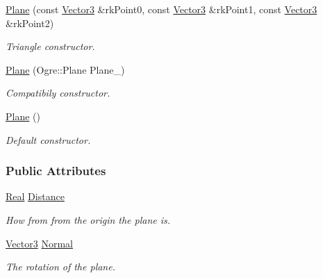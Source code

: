 \begin{DoxyCompactItemize}
\hyperlink{classMezzanine_1_1Plane_aabe30579ed531b3b0b2a7bd9ad412d3f}{Plane} (const \hyperlink{classMezzanine_1_1Vector3}{Vector3} \&rkPoint0, const \hyperlink{classMezzanine_1_1Vector3}{Vector3} \&rkPoint1, const \hyperlink{classMezzanine_1_1Vector3}{Vector3} \&rkPoint2)
\begin{DoxyCompactList}\small\item\em Triangle constructor. \item\end{DoxyCompactList}\item 
\hyperlink{classMezzanine_1_1Plane_a6f6efb7d12fa74b76945d90d2d7bad0e}{Plane} (Ogre::Plane Plane\_\-)
\begin{DoxyCompactList}\small\item\em Compatibily constructor. \item\end{DoxyCompactList}\item 
\hyperlink{classMezzanine_1_1Plane_a5d8a918982fe5424be3e9a11b1a849c2}{Plane} ()
\begin{DoxyCompactList}\small\item\em Default constructor. \item\end{DoxyCompactList}\end{DoxyCompactItemize}
\subsubsection*{Public Attributes}
\begin{DoxyCompactItemize}
\item 
\hypertarget{classMezzanine_1_1Plane_a434b3f31159b9c4ee75bb1f855e340a9}{
\hyperlink{namespaceMezzanine_a726731b1a7df72bf3583e4a97282c6f6}{Real} \hyperlink{classMezzanine_1_1Plane_a434b3f31159b9c4ee75bb1f855e340a9}{Distance}}
\label{classMezzanine_1_1Plane_a434b3f31159b9c4ee75bb1f855e340a9}

\begin{DoxyCompactList}\small\item\em How from from the origin the plane is. \item\end{DoxyCompactList}\item 
\hypertarget{classMezzanine_1_1Plane_a53739e48e75ba8fc6c6bfc55f96cf201}{
\hyperlink{classMezzanine_1_1Vector3}{Vector3} \hyperlink{classMezzanine_1_1Plane_a53739e48e75ba8fc6c6bfc55f96cf201}{Normal}}
\label{classMezzanine_1_1Plane_a53739e48e75ba8fc6c6bfc55f96cf201}

\begin{DoxyCompactList}\small\item\em The rotation of the plane. \item\end{DoxyCompactList}\end{DoxyCompactItemize}


